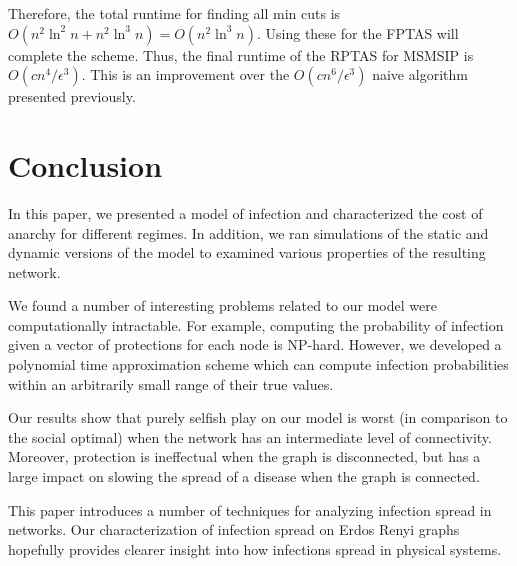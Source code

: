 \documentclass{article}
\theoremstyle{plain}
\begin{document}
Therefore, the total runtime for finding all min cuts is $O(n^2 \ln^2 n + n^2 \ln^3 n) = O(n^2 \ln^3 n)$. Using these for the FPTAS will complete the scheme. Thus, the final runtime of the RPTAS for MSMSIP is $O(c n^4 / \epsilon^3)$. This is an improvement over the $O(c n^6 / \epsilon^3)$ naive algorithm presented previously.

\section{Conclusion}

In this paper, we presented a model of infection and characterized the cost of anarchy for different regimes. In addition, we ran simulations of the static and dynamic versions of the model to examined various properties of the resulting network.

We found a number of interesting problems related to our model were computationally intractable. For example, computing the probability of infection given a vector of protections for each node is NP-hard. However, we developed a polynomial time approximation scheme which can compute infection probabilities within an arbitrarily small range of their true values.

Our results show that purely selfish play on our model is worst (in comparison to the social optimal) when the network has an intermediate level of connectivity. Moreover, protection is ineffectual when the graph is disconnected, but has a large impact on slowing the spread of a disease when the graph is connected. 

This paper introduces a number of techniques for analyzing infection spread in networks. Our characterization of infection spread on Erdos Renyi graphs hopefully provides clearer insight into how infections spread in physical systems.
\end{document}
